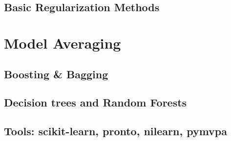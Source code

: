 \documentclass{beamer}
\begin{document}
    \subsection{Basic Regularization Methods}                                
\section{Model Averaging}
    \subsection{Boosting \& Bagging}                                         
    \subsection{Decision trees and Random Forests}                           
    \subsection{Tools: scikit-learn, pronto, nilearn, pymvpa}                
\end{document}
